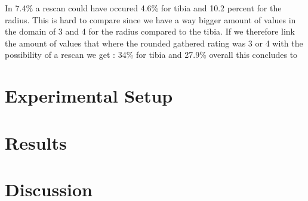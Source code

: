 \documentclass[
a4paper, 
12pt,
grayscalebody, %
abstract=on,
twoside, BCOR10mm, 12pt, DIV13,headinclude, footexclude, final, abstracton, openright
]{ibireprt}
\numberwithin{equation}{chapter}
\numberwithin{table}{chapter}
\numberwithin{figure}{chapter}
\numberwithin{algorithm}{chapter}
\numberwithin{example}{chapter}
\numberwithin{example}{chapter}
\begin{document}
In 7.4\% a rescan could have occured 4.6\% for tibia and 10.2 percent for the radius. This is hard to compare since we have a way bigger amount of values in the domain of 3 and 4 for the radius compared to the tibia. If we therefore link the amount of values that where the rounded gathered rating was 3 or 4 with the possibility of a rescan we get : 34\% for tibia and 27.9\% overall this concludes to  %
\chapter{Experimental Setup}



\chapter{Results}

\chapter{Discussion}


\end{document}
